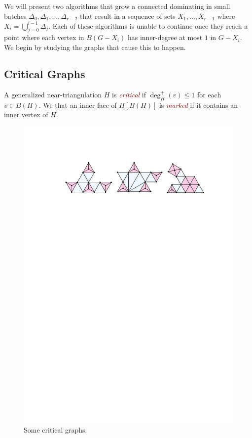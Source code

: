 \documentclass[12pt]{article}
\newcommand{\defin}[1]{\emph{\textcolor{Maroon}{#1}}}
\theoremstyle{definition}
\begin{document}
We will present two algorithms that grow a connected dominating in small batches $\Delta_0,\Delta_1,\ldots,\Delta_{r-2}$ that result in a sequence of sets $X_1,\ldots,X_{r-1}$ where $X_{i}=\bigcup_{j=0}^{i-1}\Delta_j$.  Each of these algorithms is unable to continue once they reach a point where each vertex in $B(G-X_i)$ has inner-degree at most $1$ in $G-X_i$.  We begin by studying the graphs that cause this to happen.

\subsection{Critical Graphs}

A generalized near-triangulation $H$ is \defin{critical} if $\deg^+_H(v)\le 1$ for each $v\in B(H)$. We that an inner face of $H[B(H)]$ is \defin{marked} if it contains an inner vertex of $H$.

\begin{figure}[htbp]
    \centering
    \includegraphics[page=1]{figs/critical}
    \caption{Some critical graphs.}
    \label{critical_fig}
\end{figure}
\end{document}
